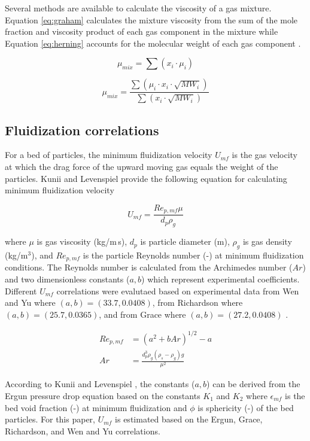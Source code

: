 Several methods are available to calculate the viscosity of a gas mixture. Equation \ref{eq:graham} calculates the mixture viscosity from the sum of the mole fraction and viscosity product of each gas component in the mixture \cite{Graham-1846} while Equation \ref{eq:herning} accounts for the molecular weight of each gas component \cite{Herning-1936}.

\begin{equation}\label{eq:graham}
    \mu_{mix} = \sum(x_i \cdot \mu_i)
\end{equation}

\begin{equation}\label{eq:herning}
    \mu_{mix} = \frac{\sum(\mu_i \cdot x_i \cdot \sqrt{MW_i})}{\sum(x_i \cdot \sqrt{MW_i})}
\end{equation}

\subsection{Fluidization correlations}

For a bed of particles, the minimum fluidization velocity $U_{mf}$ is the gas velocity at which the drag force of the upward moving gas equals the weight of the particles. Kunii and Levenspiel \cite{Levenspiel-1991} provide the following equation for calculating minimum fluidization velocity

\begin{equation}
    U_{mf} = \frac{Re_{p,mf} \mu}{d_p \rho_g}
\end{equation}

\noindent where $\mu$ is gas viscosity (kg/m\,s), $d_p$ is particle diameter (m), $\rho_g$ is gas density (kg/m$^3$), and $Re_{p,mf}$ is the particle Reynolds number (-) at minimum fluidization conditions. The Reynolds number is calculated from the Archimedes number ($Ar$) and two dimensionless constants ($a, b$) which represent experimental coefficients. Different $U_{mf}$ correlations were evalutaed based on experimental data from Wen and Yu where $(a, b) = (33.7, 0.0408)$, from Richardson where $(a, b) = (25.7, 0.0365)$, and from Grace where $(a, b) = (27.2, 0.0408)$ \cite{Levenspiel-1991}.

\begin{align}
    Re_{p,mf} &= \left( a^2 + b Ar \right)^{1/2} - a \\
    Ar &= \frac{d_p^3 \rho_g (\rho_s - \rho_g) g}{\mu^2}
\end{align}

According to Kunii and Levenspiel \cite{Levenspiel-1991}, the constants ($a, b$) can be derived from the Ergun pressure drop equation based on the constants $K_1$ and $K_2$ where $\epsilon_{mf}$ is the bed void fraction (-) at minimum fluidization and $\phi$ is sphericity (-) of the bed particles. For this paper, $U_{mf}$ is estimated based on the Ergun, Grace, Richardson, and Wen and Yu correlations.

